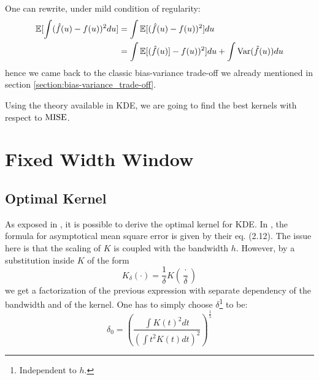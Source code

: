 \begin{remarque}
One can rewrite, under mild condition of regularity:
\begin{align*}
\mathbb E [ \int ( \hat{f}(u) - f(u) )^2 du ] &= \int \mathbb E [( \hat{f}(u) - f(u) )^2 ] du \\
&= \int  \mathbb E[ (\hat{f}(u) ] - f(u) )^2 ] du + \int \mathrm{Var}( \hat{f}(u)) du 
\end{align*}
hence we came back to the classic bias-variance trade-off we already mentioned in section \ref{section:bias-variance_trade-off}.
\end{remarque}

Using the theory available in KDE, we are going to find the best kernels with respect to $\operatorname{MISE}$.

\section{Fixed Width Window}
\label{section:FWW}
\subsection{Optimal Kernel}

As exposed in \cite{Wand}, it is possible to derive the optimal kernel for KDE. In \cite{Wand}, the formula for asymptotical mean square error is given by their eq. (2.12). The issue here is that the scaling of $K$ is coupled with the bandwidth $h$. However, by a substitution inside $K$ of the form 
$$ K_{\delta} ( \cdot ) = \frac 1  {\delta } K \left ( \frac {\cdot } { \delta } \right ) $$
we get a factorization of the previous expression with separate dependency of the bandwidth and of the kernel. One has to simply choose $\delta$\footnote{Independent to $h$.} to be: $$ \delta_0 = \left ( \frac{ \int K(t)^2 dt }{ \left ( \int t^2 K(t) dt \right )^2 } \right ) ^{\frac 1 5} $$


